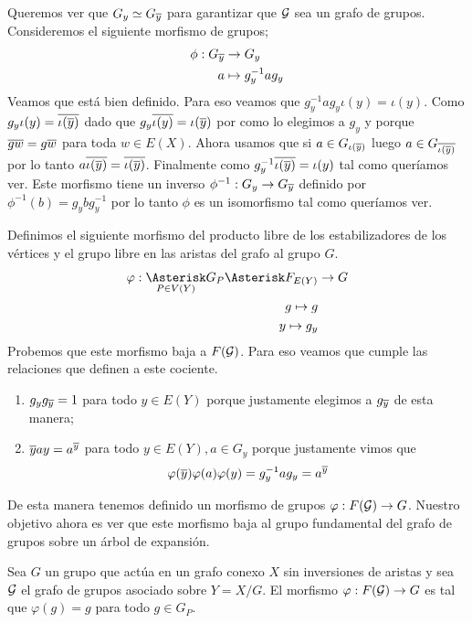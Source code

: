 \documentclass[tesis.tex]{subfiles}
\begin{document}
Queremos ver que $G_{y} \simeq G_{\overline y}$ para garantizar que ${\cal G}$ sea un grafo de grupos.
Consideremos el siguiente morfismo de grupos;
\begin{align*}
	\phi: G_{\overline y} &\to G_{y} \\
	a &\mapsto g_{y}^{-1}ag_{y}
\end{align*}
Veamos que está bien definido. 
Para eso veamos que $g_{y}^{-1}ag_{y} \iota(y) = \iota(y)$.
Como $g_y \iota(y) = \overline{\iota(\overline y)}$ dado que $g_y \overline{\iota(y)} = \iota (\overline y)$ por como lo elegimos a $g_y$ y porque $\overline{gw} = g \overline w$ para toda $w \in E(X)$.
Ahora usamos que si $a \in G_{\iota({\overline y})}$ luego $a \in G_{\overline{\iota(\overline y)}}$ por lo tanto $a \overline{\iota(\overline y)} = \overline{\iota(\overline y)} $.
Finalmente como $ g_{y}^{-1} \overline {\iota (\overline y) } = \iota (y)$ tal como queríamos ver.
Este morfismo tiene un inverso $\phi^{-1}: G_{y} \to G_{\overline y}$ definido por $\phi^{-1}(b) = g_{y}bg_{y}^{-1}$ por lo tanto $\phi$ es un isomorfismo tal como queríamos ver.

Definimos el siguiente morfismo del producto libre de los estabilizadores de los vértices y el grupo libre en las aristas del grafo al grupo $G$.
\begin{align*}
	\varphi: \underset{P \in V(Y)}{\Asterisk} G_P \Asterisk F_{E(Y)} &\to G	\\
	g \mapsto g \\
	y \mapsto g_y \\
\end{align*}
Probemos que este morfismo baja a $F({\cal G})$. 
Para eso veamos que cumple las relaciones que definen a este cociente.
\begin{enumerate}
	\item $g_y g_{\overline y} = 1$ para todo $y \in E(Y)$ porque justamente elegimos a $g_{\overline y}$ de esta manera;
	\item $\overline y a y = a^{\overline y}$ para todo $y \in E(Y), a \in G_y$ porque justamente vimos que 
	\[
		\varphi(\overline y) \varphi (a) \varphi(y) = g_y^{-1}ag_y = a^{\overline y}
	\]
\end{enumerate}

De esta manera tenemos definido un morfismo de grupos $\varphi: F({\cal G}) \to G$.
Nuestro objetivo ahora es ver que este morfismo baja al grupo fundamental del grafo de grupos sobre un árbol de expansión.

\begin{lema}\label{lema_morfismo_pi1_inyectivo}
	Sea $G$ un grupo que actúa en un grafo conexo $X$ sin inversiones de aristas y sea ${\cal G}$ el grafo de grupos asociado sobre $Y = X / G$.
	El morfismo $\varphi:F({\cal G}) \to G$ es tal que $\varphi(g) = g$ para todo $g \in G_{P}$.
\end{lema}
\end{document}
